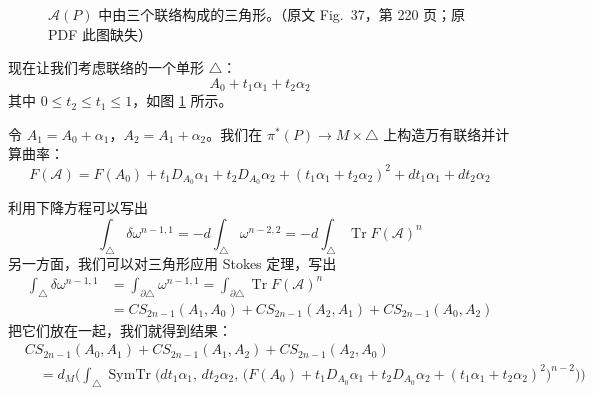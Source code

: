 \begin{figure}[htbp]
  \centering
  \MissingFigureNote
  \caption{$\mathcal{A}(P)$ 中由三个联络构成的三角形。（原文 Fig.~37，第 220 页；原 PDF 此图缺失）}
  \label{fig:37}
\end{figure}

现在让我们考虑联络的一个单形 $\triangle$：
\begin{equation}
  A_0+t_1\alpha_1+t_2\alpha_2
  \tag{I.43}
  \label{eq:I.43}
\end{equation}
其中 $0\le t_2\le t_1\le 1$，如图 \ref{fig:37} 所示。

令 $A_1=A_0+\alpha_1$，$A_2=A_1+\alpha_2$。我们在 $\pi^*(P)\to M\times\triangle$ 上构造万有联络并计算曲率：
\begin{equation}
  F(\mathcal{A}) = F(A_0)+t_1D_{A_0}\alpha_1+t_2D_{A_0}\alpha_2
  +(t_1\alpha_1+t_2\alpha_2)^2+dt_1\alpha_1+dt_2\alpha_2
  \tag{I.44}
  \label{eq:I.44}
\end{equation}

利用下降方程可以写出
\begin{equation}
  \int_\triangle\delta\omega^{n-1,1}
  = -d\int_\triangle\omega^{n-2,2}
  = -d\int_\triangle\operatorname{Tr}F(\mathcal{A})^n
  \tag{I.45}
  \label{eq:I.45}
\end{equation}
另一方面，我们可以对三角形应用 Stokes 定理，写出
\begin{equation}
\begin{aligned}
  \int_\triangle\delta\omega^{n-1,1}
  &= \int_{\partial\triangle}\omega^{n-1,1}
  = \int_{\partial\triangle}\operatorname{Tr}F(\mathcal{A})^n\\
  &= CS_{2n-1}(A_1,A_0)+CS_{2n-1}(A_2,A_1)+CS_{2n-1}(A_0,A_2)
\end{aligned}
  \tag{I.46}
  \label{eq:I.46}
\end{equation}
把它们放在一起，我们就得到结果：
\begin{equation}
\begin{aligned}
  &CS_{2n-1}(A_0,A_1)+CS_{2n-1}(A_1,A_2)+CS_{2n-1}(A_2,A_0)\\
  &\quad = d_M\Bigg(\int_\triangle \operatorname{SymTr}\Big(dt_1\alpha_1,\,dt_2\alpha_2,\,
    \big(F(A_0)+t_1D_{A_0}\alpha_1+t_2D_{A_0}\alpha_2+(t_1\alpha_1+t_2\alpha_2)^2\big)^{n-2}\Big)\Bigg)
\end{aligned}
  \tag{I.47}
  \label{eq:I.47}
\end{equation}

